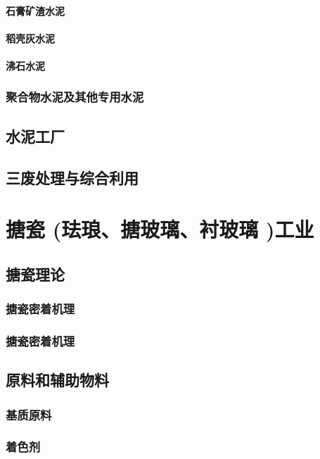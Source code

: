\documentclass[UTF8]{../../ApplicationUniverse}
\begin{document}
        \subsubsection{石膏矿渣水泥}
        \subsubsection{稻壳灰水泥}
        \subsubsection{沸石水泥}
    \subsection{聚合物水泥及其他专用水泥}
\section{水泥工厂}
\section{三废处理与综合利用}









\chapter{搪瓷 (珐琅、搪玻璃、衬玻璃 )工业}
\section{搪瓷理论}
    \subsection{搪瓷密着机理}
    \subsection{搪瓷密着机理}
\section{原料和辅助物料}
    \subsection{基质原料}
    \subsection{着色剂}
\end{document}
